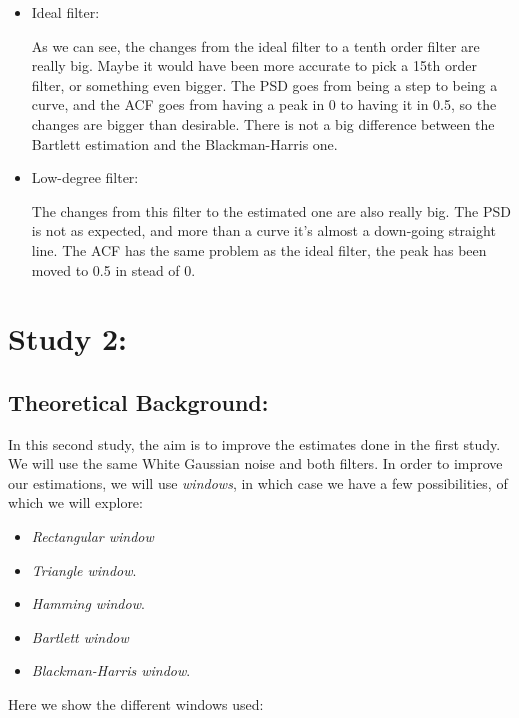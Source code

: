 \documentclass[a4paper,11pt]{article}
\begin{document}
\begin{itemize}

\item Ideal filter:

As we can see, the changes from the ideal filter to a tenth order filter are really big. Maybe it would have been more accurate to pick a 15th order filter, or something even bigger. The PSD goes from being a step to being a curve, and the ACF goes from having a peak in 0 to having it in 0.5, so the changes are bigger than desirable.
There is not a big difference between the Bartlett estimation and the Blackman-Harris one.

\item Low-degree filter:

The changes from this filter to the estimated one are also really big. The PSD is not as expected, and more than a curve it's almost a down-going straight line. The ACF has the same problem as the ideal filter, the peak has been moved to 0.5 in stead of 0.

\end{itemize}

\newpage

\section{Study 2:}

\subsection{Theoretical Background:}

In this second study, the aim is to improve the estimates done in the first study.
We will use the same White Gaussian noise and both filters.
In order to improve our estimations, we will use \textit{windows}, in which case we have a few possibilities,
of which we will explore:

\begin{itemize}
  \item \textit{Rectangular window}
  \item \textit{Triangle window}.
  \item \textit{Hamming window}.
  \item \textit{Bartlett window}
  \item \textit{Blackman-Harris window}.
\end{itemize}

Here we show the different windows used:
\end{document}
